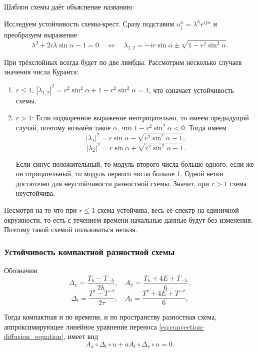 \documentclass{article}
\begin{document}
Шаблон схемы даёт объяснение названию: \\



\begin{example}
	Исследуем устойчивость схемы-крест. Сразу подставим
	$u_j^n=\lambda^ne^{ij\alpha}$ и преобразуем выражение:
	\[\lambda^2+2i\lambda\sin\alpha-1=0\quad\Leftrightarrow\quad
	\lambda_{1,2}=-ir\sin\alpha\pm\sqrt{1-r^2\sin^2\alpha}.\]

	При трёхслойных всегда будет по две лямбды. Рассмотрим несколько
	случаев значения числа Куранта:
	\begin{enumerate}[nosep]
		\item $r\le 1$: $|\lambda_{1,2}|^2=r^2\sin^2\alpha+1-
			r^2\sin^2\alpha=1$, что означает устойчивость схемы.
		\item $r>1$: Если подкоренное выражение неотрицательно, то
			имеем предыдущий случай, поэтому возьмём такое $\alpha$,
			что $1-r^2\sin^2\alpha < 0$. Тогда имеем
			\[|\lambda_1|^2=r\sin\alpha-\sqrt{r^2\sin^2\alpha-1},\]
			\[|\lambda_2|^2=r\sin\alpha+\sqrt{r^2\sin^2\alpha-1}.\]

			Если синус положительный, то модуль второго числа больше
			одного, если же он отрицательный, то модуль первого
			числа больше 1. Одной ветки достаточно для
			неустойчивости разностной схемы. Значит, при $r>1$ схема
			неустойчива.
	\end{enumerate}

	Несмотря на то что при $r\le 1$ схема устойчива, весь её спектр на
	единичной окружности, то есть с течением времени начальные данные будут
	без изменения. Поэтому такой схемой пользоваться нельзя.
\end{example}

\subsubsection{Устойчивость компактной разностной схемы}
\begin{define}
	Обозначим
	\[\Delta_x=\frac{T_h-T_{-h}}{2h},\quad A_x=\frac{T_h+4E+T_{-h}}{6},\]
	\[\Delta_t=\frac{T^\tau-T^{-\tau}}{2\tau},\quad A_t=\frac{T^\tau+4E+
	T^{-\tau}}{6},\]

	Тогда компактная и по времени, и по пространству разностная схема,
	аппроксимирующее линейное уравнение переноса
	\eqref{eq:convection-diffusion_equation}, имеет вид
	\[A_x\circ\Delta_t\circ u+aA_t\circ\Delta_x\circ u=0.\]
\end{define}
\end{document}
